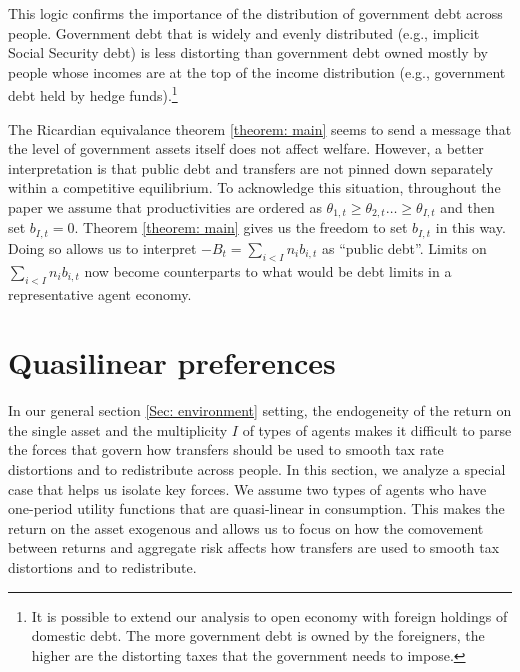 \documentclass[thmsb,11pt]{article}
\begin{document}
This logic confirms the importance of  the distribution of government debt across people. Government debt that is widely and evenly distributed
(e.g., implicit Social Security debt) is less distorting than
 government debt owned mostly by people whose incomes are at the top of the income
distribution (e.g., government debt held by hedge funds).\footnote{%
It is possible to extend our analysis to open economy with foreign
holdings of domestic debt. The more government debt is owned by the
foreigners, the higher are the distorting taxes that  the government  needs to
impose.}
\color{black}
%


The Ricardian equivalance theorem  \ref{theorem: main} seems to
send a message that the level of government assets itself does not affect welfare. However, a 
better  interpretation is that public debt and transfers are 
not  pinned down separately within a competitive equilibrium. To acknowledge this situation,
throughout the paper  we assume that productivities are ordered as 
$\theta_{1,t}\geq\theta_{2,t}\ldots\geq \theta_{I,t}$ and then set $b_{I,t}=0$.
Theorem   \ref{theorem: main} gives us the freedom to set $b_{I,t}$ in this way.  Doing so 
allows us to interpret $-B_t=\sum_{i<I}n_ib_{i,t}$ as ``public debt''.  
Limits on $\sum_{i<I}n_ib_{i,t}$ now  become  counterparts  to what would be 
debt limits in a representative agent economy. 



\section{Quasilinear preferences}\label{Sec: quasilinear}

In our general   section \ref{Sec: environment} setting, the endogeneity of the return on the single asset and the multiplicity $I$ of types of agents makes it
difficult to parse the forces that govern how  transfers should be used to smooth tax rate distortions and to redistribute across people. 
In this section, we analyze a special case that helps us isolate key  forces. We assume two types of agents who have one-period utility 
functions that are quasi-linear in consumption. 
This  makes the return on the asset exogenous and allows us to focus on how
the comovement between returns and aggregate risk affects how transfers are used to smooth tax distortions and to redistribute.
\end{document}

